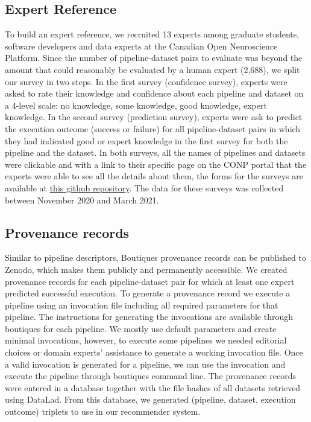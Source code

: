 \documentclass[conference]{IEEEtran}
\begin{document}
\subsection{Expert Reference}

To build an expert reference, we recruited 13 experts among graduate
students, software developers and data experts at the Canadian Open
Neuroscience Platform. Since the number of pipeline-dataset pairs to
evaluate was beyond the amount that could reasonably be evaluated by a
human expert (2,688), we split our survey in two steps. In the first survey
(confidence survey), experts were asked to rate their knowledge and
confidence about each pipeline and dataset on a 4-level scale: no
knowledge, some knowledge, good knowledge, expert knowledge. In the second
survey (prediction survey), experts were ask to predict the execution
outcome (success or failure) for all pipeline-dataset pairs in which they
had indicated good or expert knowledge in the first survey for both the
pipeline and the dataset. In both surveys, all the names of pipelines and datasets were clickable and with a link to their specific page on the CONP portal that the experts were able to see all the details about them, the forms for the surveys are available at \href{https://github.com/mandana-mazaheri/Pipelines-datasets-recommender-paper/blob/master/data}{this github repository}. The data for these surveys was collected between November 2020 and March 2021.


\subsection{Provenance records} 

Similar to pipeline descriptors, Boutiques provenance records can be
published to Zenodo, which makes them publicly and permanently accessible.
We created provenance records for each pipeline-dataset pair for which at least one expert predicted successful execution. To generate a provenance record we execute a pipeline using an invocation file including all required parameters for that pipeline. The instructions for generating the invocations are available through boutiques for each pipeline. We mostly use default parameters and create minimal invocations, however, to execute some pipelines we needed editorial choices or domain experts' assistance to generate a working invocation file. Once a valid invocation is generated for a pipeline, we can use the invocation and execute the pipeline through boutiques command line.
The provenance records were entered in a database together with the file hashes of all datasets retrieved using DataLad. From this database, we generated (pipeline,
dataset, execution outcome) triplets to use in our recommender system.
\end{document}
